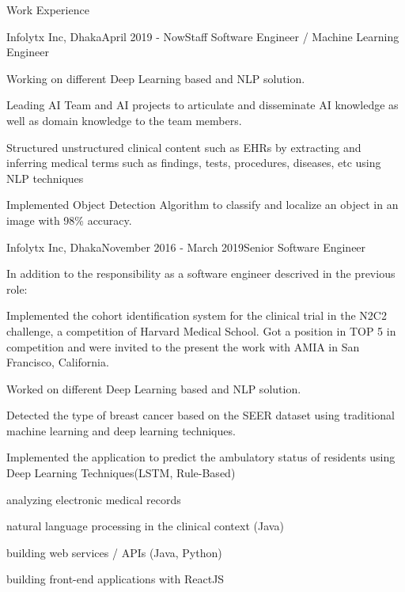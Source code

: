 \documentclass{resume} %
\begin{document}
\begin{rSection}{Work Experience}

\begin{rSubsection}{Infolytx Inc, Dhaka}{April 2019 - Now}{Staff Software Engineer / Machine Learning Engineer }{}
\item Working on different Deep Learning based and NLP solution. 
\item Leading AI Team and AI projects to articulate and disseminate AI knowledge as well as domain knowledge to the team members.
\item Structured unstructured clinical content such as EHRs by extracting and inferring medical terms such as findings, tests, procedures, diseases, etc using NLP techniques
\item Implemented Object Detection Algorithm to classify and localize an object in an image with 98\% accuracy.
\end{rSubsection}

\begin{rSubsection}{Infolytx Inc, Dhaka}{November 2016 - March 2019}{Senior Software Engineer}{}
\item 
In addition to the responsibility as a software engineer descrived in the previous role:

\item Implemented the cohort identification system for the clinical trial in the N2C2 challenge, a competition of Harvard Medical School.  Got a position in TOP 5 in competition and were invited to the present the work with AMIA in San Francisco, California.
\item Worked on different Deep Learning based and NLP solution. 
\item Detected the type of breast cancer based on the SEER dataset using traditional machine learning and deep learning techniques.
\item Implemented  the application to predict the ambulatory status of residents using Deep Learning Techniques(LSTM, Rule-Based) 
\item analyzing electronic medical records
\item natural language processing in the clinical context (Java)
\item building web services / APIs (Java, Python)
\item building front-end applications with ReactJS

\end{rSubsection}


\end{rSection}
\end{document}
